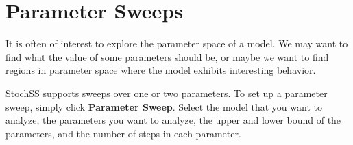 
\chapter{Parameter Sweeps}

It is often of interest to explore the parameter space of a model. We may want to find what the value of some parameters should be, or maybe we want to find regions in parameter space where the model exhibits interesting behavior.

StochSS supports sweeps over one or two parameters. To set up a parameter sweep, simply click \textbf{Parameter Sweep}. Select the model that you want to analyze, the parameters you want to analyze, the upper and lower bound of the parameters, and the number of steps in each parameter.

